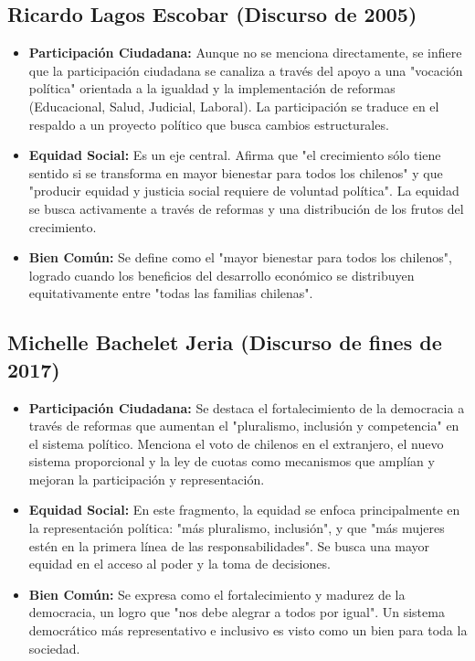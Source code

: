 \documentclass[11pt]{article}
\begin{document}
\subsection*{Ricardo Lagos Escobar (Discurso de 2005)}
\begin{itemize}
    \item \textbf{Participación Ciudadana:} Aunque no se menciona directamente, se infiere que la participación ciudadana se canaliza a través del apoyo a una "vocación política" orientada a la igualdad y la implementación de reformas (Educacional, Salud, Judicial, Laboral). La participación se traduce en el respaldo a un proyecto político que busca cambios estructurales.
    \item \textbf{Equidad Social:} Es un eje central. Afirma que "el crecimiento sólo tiene sentido si se transforma en mayor bienestar para todos los chilenos" y que "producir equidad y justicia social requiere de voluntad política". La equidad se busca activamente a través de reformas y una distribución de los frutos del crecimiento.
    \item \textbf{Bien Común:} Se define como el "mayor bienestar para todos los chilenos", logrado cuando los beneficios del desarrollo económico se distribuyen equitativamente entre "todas las familias chilenas".
\end{itemize}

\subsection*{Michelle Bachelet Jeria (Discurso de fines de 2017)}
\begin{itemize}
    \item \textbf{Participación Ciudadana:} Se destaca el fortalecimiento de la democracia a través de reformas que aumentan el "pluralismo, inclusión y competencia" en el sistema político. Menciona el voto de chilenos en el extranjero, el nuevo sistema proporcional y la ley de cuotas como mecanismos que amplían y mejoran la participación y representación.
    \item \textbf{Equidad Social:} En este fragmento, la equidad se enfoca principalmente en la representación política: "más pluralismo, inclusión", y que "más mujeres estén en la primera línea de las responsabilidades". Se busca una mayor equidad en el acceso al poder y la toma de decisiones.
    \item \textbf{Bien Común:} Se expresa como el fortalecimiento y madurez de la democracia, un logro que "nos debe alegrar a todos por igual". Un sistema democrático más representativo e inclusivo es visto como un bien para toda la sociedad.
\end{itemize}
\end{document}
